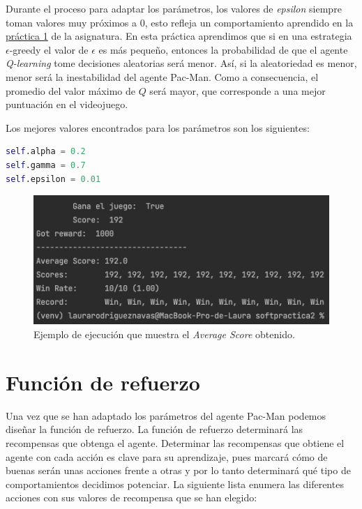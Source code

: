 \documentclass[11pt]{exam}
\begin{document}
Durante el proceso para adaptar los parámetros, los valores de \textit{epsilon} siempre toman valores muy próximos a 0, esto refleja un comportamiento aprendido en la \href{https://poliformat.upv.es/portal/site/ESP_0_2835/tool/c07b745a-0cfd-44f0-a7a2-9bb22f80c3f7?panel=Main}{práctica 1} de la asignatura. En esta práctica aprendimos que si en una estrategia $\epsilon$-greedy el valor de $\epsilon$ es más pequeño, entonces la probabilidad de que el agente \textit{Q-learning} tome decisiones aleatorias será menor. Así, si la aleatoriedad es menor, menor será la inestabilidad del agente Pac-Man. Como a consecuencia, el promedio del valor máximo de $Q$ será mayor, que corresponde a una mejor puntuación en el videojuego.

\newpage 

Los mejores valores encontrados para los parámetros son los siguientes:
\vspace*{3mm}

\begin{lstlisting}[language=python, basicstyle=\footnotesize]
self.alpha = 0.2
self.gamma = 0.7
self.epsilon = 0.01
\end{lstlisting}

\begin{figure}[H]
	\centering
	\includegraphics[scale=0.5]{average_score}
	\caption{Ejemplo de ejecución que muestra el  \textit{Average Score} obtenido.}
	\label{average_score}
\end{figure}


\section{Función de refuerzo}\label{refuerzo}

Una vez que se han adaptado los parámetros del agente Pac-Man podemos diseñar la función de refuerzo. La función de refuerzo determinará las recompensas que obtenga el agente. Determinar las recompensas que obtiene el agente con cada acción es clave para su aprendizaje, pues marcará cómo de buenas serán unas acciones frente a otras y por lo tanto determinará qué tipo de comportamientos decidimos potenciar. La siguiente lista enumera las diferentes acciones con sus valores de recompensa que se han elegido:
\end{document}
